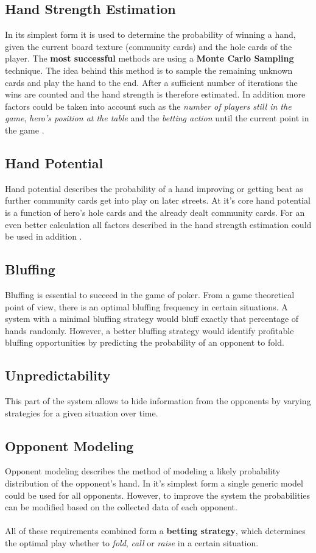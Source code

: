 \subsection{Hand Strength Estimation}
In its simplest form it is used to determine the probability of winning a hand, given the current board texture (community cards) and the hole cards of the player.
The \textbf{most successful} methods are using a \textbf{Monte Carlo Sampling} technique. The idea behind this method is to sample the remaining unknown cards and play the hand to the end. After a sufficient number of iterations the wins are counted and the hand strength is therefore estimated. In addition more factors could be taken into account such as the \textit{number of players still in the game},  \textit{hero's position at the table} and the \textit{betting action} until the current point in the game \cite{key_components}.
\subsection{Hand Potential}
Hand potential describes the probability of a hand improving or getting beat as further community cards get into play on later streets. At it's core hand potential is a function of hero's hole cards and the already dealt community cards. For an even better calculation all factors described in the hand strength estimation could be used in addition \cite{key_components}.
\subsection{Bluffing}
Bluffing is essential to succeed in the game of poker. From a game theoretical point of view, there is an optimal bluffing frequency in certain situations. A system with a minimal bluffing strategy would bluff exactly that percentage of hands randomly. However, a better bluffing strategy would identify profitable bluffing opportunities by predicting the probability of an opponent to fold. \cite{phd_poker}
\subsection{Unpredictability}
This part of the system allows to hide information from the opponents by varying strategies for a given situation over time. \cite{phd_poker}
\subsection{Opponent Modeling}
Opponent modeling describes the method of modeling a likely probability distribution of the opponent's hand. In it's simplest form a single generic model could be used for all opponents. However, to improve the system the probabilities can be modified based on the collected data of each opponent. \cite{phd_poker}\\\\
All of these requirements combined form a \textbf{betting strategy}, which determines the optimal play whether to \textit{fold}, \textit{call} or \textit{raise} in a certain situation.
